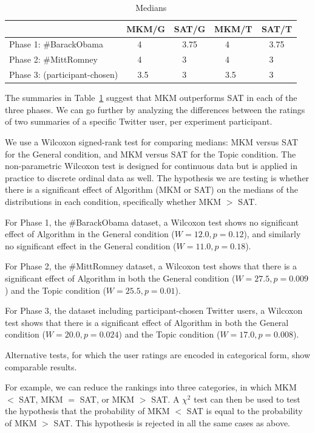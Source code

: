 \begin{table}
\begin{center}
\begin{tabular}{|l|llllll|llllll|}
\hline
& \multicolumn{3}{c}{MKM\slash G} & \multicolumn{3}{c|}{SAT\slash G} & \multicolumn{3}{|c}{MKM\slash T} & \multicolumn{3}{c|}{SAT\slash T} \\
\hline
Phase 1: \#BarackObama      & & 4    & & & 3.75 & & & 4 & & & 3.75 & \\
Phase 2: \#MittRomney       & & 4    & & & 3    & & & 4 & & & 3  & \\
Phase 3: (participant-chosen) & & 3.5  & & & 3    & & & 3.5 & & & 3  & \\
\hline
\end{tabular}
\end{center}
\caption{Medians}
\label{tab:modes}
\end{table}

The summaries in Table~\ref{tab:modes} suggest that MKM outperforms
SAT in each of the three phases.  We can go further by analyzing
the differences between the ratings of two summaries of a specific
Twitter user, per experiment participant.  

We use a Wilcoxon signed-rank test for comparing medians: MKM versus
SAT for the General condition, and MKM versus SAT for the Topic
condition.  The non-parametric Wilcoxon test is designed for
continuous data but is applied in practice to discrete ordinal data as
well.  The hypothesis we are testing is whether there is a significant
effect of Algorithm (MKM or SAT) on the medians of the distributions
in each condition, specifically whether MKM $>$ SAT.

For Phase 1, the \#BarackObama dataset, a Wilcoxon test shows no
significant effect of Algorithm in the General condition ($W = 12.0, p
= 0.12$), and similarly no significant effect in the General condition
($W = 11.0, p = 0.18$).

For Phase 2, the \#MittRomney dataset, a Wilcoxon test shows that
there is a significant effect of Algorithm in both the General
condition ($W = 27.5, p = 0.009$) and the Topic condition ($W = 25.5,
p = 0.01$).

For Phase 3, the dataset including participant-chosen Twitter users, a
Wilcoxon test shows that there is a significant effect of Algorithm in
both the General condition ($W = 20.0, p = 0.024$) and the Topic
condition ($W = 17.0, p = 0.008$).

Alternative tests, for which the user ratings are encoded in
categorical form, show comparable results.  

For example, we can reduce the rankings into three categories, in
which MKM $<$ SAT, MKM $=$ SAT, or MKM $>$ SAT.  A $\chi^2$ test can
then be used to test the hypothesis that the probability of MKM $<$
SAT is equal to the probability of MKM $>$ SAT.  This hypothesis is
rejected in all the same cases as above.